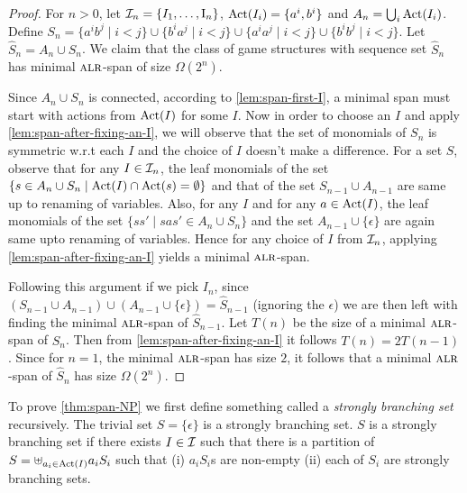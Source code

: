 \begin{proof}
  For $n > 0$, let $\mathcal{I}_n = \{I_1,\dots,\operatorname{I}_n\}$, $\operatorname{Act}(I_i) = \{a^i,b^i\}$ and $A_n = \bigcup_i \operatorname{Act}(I_i)$. Define $S_n = \{a^ib^j \mid i < j\} \cup \{b^ia^j \mid i < j\} \cup \{a^ia^j \mid i < j\} \cup \{b^ib^j \mid i < j\} $. Let $\hat{S}_n =  A_n \cup
S_n$. We claim that the class of game structures with sequence set $\hat{S}_n$ has minimal $\textsc{alr}$-span of size $\Omega(2^n)$. 


  Since $A_n \cup S_n$ is connected, according to \cref{lem:span-first-I}, a minimal span must start with actions from $\operatorname{Act}(I)$ for some $I$. Now in order to choose an $I$ and apply \cref{lem:span-after-fixing-an-I}, 
we will observe that the set of monomials of $S_n$ is symmetric w.r.t each $I$ and the choice of $I$ doesn't make a difference. For a set $S$, observe that for any $I \in \mathcal{I}_n$, the leaf monomials of the set $\{s \in A_n \cup S_n  \mid  \operatorname{Act}(I) \cap \operatorname{Act}(s) = \emptyset\}$ and that of the set $S_{n-1} \cup A_{n-1}$ are same up to renaming of variables. 
Also, for any $I$ and for any $a \in \operatorname{Act}(I)$, the leaf monomials of the set $\{ ss'  \mid  sas' \in A_n \cup S_n \} $ and the set $A_{n-1} \cup \{ \epsilon \}$ are again same upto renaming of variables. 
Hence for any choice of $I$ from $\mathcal{I}_n$, applying \cref{lem:span-after-fixing-an-I} yields a minimal $\textsc{alr}$-span.


Following this argument if we pick $I_n$, since $(S_{n-1} \cup A_{n-1}) \cup (A_{n-1} \cup \{ \epsilon \}) = \hat{S}_{n-1}$ (ignoring the $\epsilon$) we are then left with finding the minimal $\textsc{alr}$-span of $\hat{S}_{n-1}$. 
Let $T(n)$ be the size of a minimal $\textsc{alr}$-span of $\hat{S}_n$. Then from \cref{lem:span-after-fixing-an-I} it follows $T(n) = 2T(n-1)$. 
Since for $n=1$, the minimal $\textsc{alr}$-span has size $2$, it follows that a minimal $\textsc{alr}$-span of $\hat{S}_n$ has size $\Omega(2^n)$. 




\end{proof}


\spanNP*

To prove \cref{thm:span-NP} we first define something called a \emph{strongly branching set} recursively.
The trivial set $S = \{ \epsilon \}$ is a strongly branching set. $S$ is a strongly branching set if there exists $I \in \mathcal{I}$ such that there is a partition of $S = \uplus_{a_i \in \operatorname{Act}(I)} a_iS_i $ such that (i) $a_iS_i$s are non-empty (ii) each of $S_i$ are strongly branching sets.

